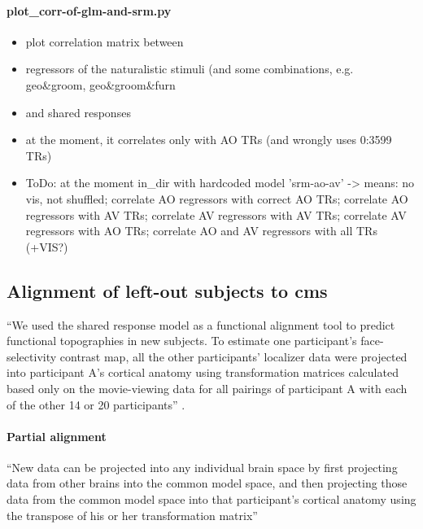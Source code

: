 \paragraph{plot\_corr-of-glm-and-srm.py}
%
\begin{itemize}
    \item plot correlation matrix between
    \item regressors of the naturalistic stimuli (and some combinations, e.g.
        geo\&groom, geo\&groom\&furn
    \item and shared responses
    \item at the moment, it correlates only with AO TRs (and wrongly uses
        0:3599 TRs)
    \item ToDo: at the moment in\_dir with hardcoded model 'srm-ao-av'
    ->  means: no vis, not shuffled; correlate AO regressors with correct AO
        TRs; correlate AO regressors with AV TRs; correlate AV regressors with
        AV TRs; correlate AV regressors with AO TRs; correlate AO and AV
        regressors with all TRs (+VIS?)
\end{itemize}


\subsection{Alignment of left-out subjects to \ac{cms}}

%
``We used the shared response model as a functional alignment tool to predict
functional topographies in new subjects. To estimate one participant's
face-selectivity contrast map, all the other participants' localizer data were
projected into participant A's cortical anatomy using transformation matrices
calculated based only on the movie-viewing data for all pairings of participant
A with each of the other 14 or 20 participants'' \citep{jiahui2020predicting}.


\paragraph{Partial alignment}

%
``New data can be projected into any individual brain space by first projecting
data from other brains into the common model space, and then projecting those
data from the common model space into that participant's cortical anatomy using
the transpose of his or her transformation matrix'' \citep{jiahui2020predicting}


